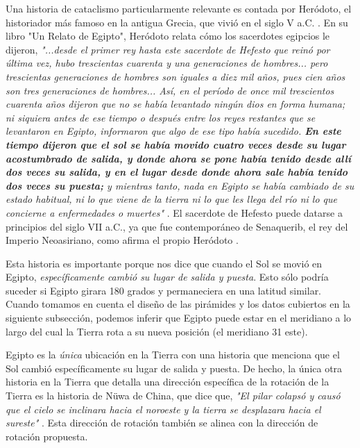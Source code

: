 \documentclass[10pt,twocolumn,letterpaper]{article}
\begin{document}
Una historia de cataclismo particularmente relevante es contada por Heródoto, el historiador más famoso en la antigua Grecia, que vivió en el siglo V a.C. \cite{31}. En su libro "Un Relato de Egipto", Heródoto relata cómo los sacerdotes egipcios le dijeron, \textit{"...desde el primer rey hasta este sacerdote de Hefesto que reinó por última vez, hubo trescientas cuarenta y una generaciones de hombres... pero trescientas generaciones de hombres son iguales a diez mil años, pues cien años son tres generaciones de hombres... Así, en el período de once mil trescientos cuarenta años dijeron que no se había levantado ningún dios en forma humana; ni siquiera antes de ese tiempo o después entre los reyes restantes que se levantaron en Egipto, informaron que algo de ese tipo había sucedido. \textbf{En este tiempo dijeron que el sol se había movido cuatro veces desde su lugar acostumbrado de salida, y donde ahora se pone había tenido desde allí dos veces su salida, y en el lugar desde donde ahora sale había tenido dos veces su puesta;} y mientras tanto, nada en Egipto se había cambiado de su estado habitual, ni lo que viene de la tierra ni lo que les llega del río ni lo que concierne a enfermedades o muertes"} \cite{32}. El sacerdote de Hefesto puede datarse a principios del siglo VII a.C., ya que fue contemporáneo de Senaquerib, el rey del Imperio Neoasiriano, como afirma el propio Heródoto \cite{32,33,34}.

Esta historia es importante porque nos dice que cuando el Sol se movió en Egipto, \textit{específicamente cambió su lugar de salida y puesta}. Esto sólo podría suceder si Egipto girara 180 grados y permaneciera en una latitud similar. Cuando tomamos en cuenta el diseño de las pirámides y los datos cubiertos en la siguiente subsección, podemos inferir que Egipto puede estar en el meridiano a lo largo del cual la Tierra rota a su nueva posición (el meridiano 31 este).

Egipto es la \textit{única} ubicación en la Tierra con una historia que menciona que el Sol cambió específicamente su lugar de salida y puesta. De hecho, la única otra historia en la Tierra que detalla una dirección específica de la rotación de la Tierra es la historia de Nüwa de China, que dice que, \textit{"El pilar colapsó y causó que el cielo se inclinara hacia el noroeste y la tierra se desplazara hacia el sureste"} \cite{8}. Esta dirección de rotación también se alinea con la dirección de rotación propuesta.
\end{document}
